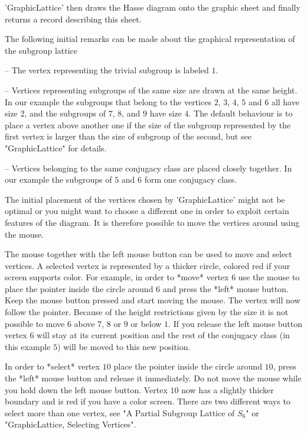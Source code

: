 'GraphicLattice' then draws the  Hasse diagram onto the graphic sheet and
finally returns a {\GAP} record describing this sheet.

The   following initial  remarks  can    be  made  about  the   graphical
representation of the subgroup lattice\:

-- The vertex representing the trivial subgroup is labeled $1$.

-- Vertices representing subgroups of the same size are drawn at the same
height.  In  our example the subgroups that  belong to  the vertices $2$,
$3$, $4$, $5$ and $6$ all have size 2, and the subgroups of $7$, $8$, and
$9$ have  size $4$.   The default  behaviour is  to place a  vertex above
another one if the  size of the subgroup  represented by the first vertex
is larger     than  the size    of subgroup   of the  second,     but see
"GraphicLattice" for details.

-- Vertices  belonging to the same  conjugacy   class  are placed closely
together.  In our example the subgroups of $5$ and $6$ form one conjugacy
class.

The initial placement  of the vertices  chosen by 'GraphicLattice'  might
not be optimal or  you might want  to choose a  different one in order to
exploit certain  features  of the diagram.  It   is therefore possible to
move the vertices around using the mouse.

The mouse  together with the  left mouse button can be  used to  move and
select vertices. A selected  vertex is represented  by a thicker  circle,
colored red  if your screen  supports color.   For  example, in  order to
*move* vertex $6$ use  the mouse to  place the pointer inside  the circle
around $6$  and  press the *left*  mouse button.   Keep the  mouse button
pressed and start  moving the  mouse.   The vertex  will  now follow  the
pointer.  Because of the height restrictions given  by the size it is not
possible to move $6$ above $7$, $8$ or $9$ or  below $1$.  If you release
the  left mouse button vertex  $6$ will stay at  its current position and
the rest of  the conjugacy class (in  this example $5$)  will be moved to
this new position.

In order  to  *select* vertex $10$  place the  pointer inside  the circle
around  $10$, press the *left* mouse  button and  release it immediately.
Do not move the mouse while you hold down the left  mouse button.  Vertex
$10$ now has a slightly thicker  boundary and is red  if you have a color
screen.  There are  two different ways  to select more than  one  vertex,
see "A Partial Subgroup  Lattice of $S_6$" or "GraphicLattice,  Selecting
Vertices".

